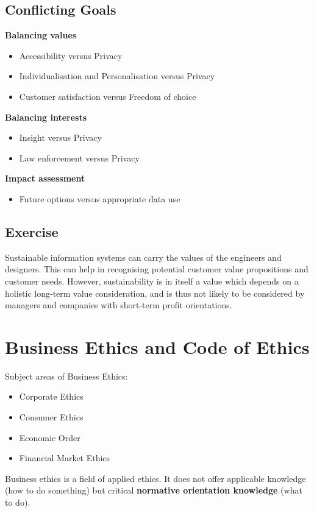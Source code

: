 \documentclass[11pt]{article}
\theoremstyle{definition}
\begin{document}
\subsection{Conflicting Goals}
\textbf{Balancing values}
\begin{itemize}[label=-]
	\item Accessibility versus Privacy
	\item Individualisation and Personalisation versus Privacy
	\item Customer satisfaction versus Freedom of choice
\end{itemize}
\textbf{Balancing interests}
\begin{itemize}[label=-]
	\item Insight versus Privacy
	\item Law enforcement versus Privacy
\end{itemize}
\textbf{Impact assessment}
\begin{itemize}[label=-]
	\item Future options versus appropriate data use
\end{itemize}

\subsection{Exercise}
Sustainable information systems can carry the values of the engineers and designers. This can help in recognising potential customer value propositions and customer needs. However, sustainability is in itself a value which depends on a holistic long-term value consideration, and is thus not likely to be considered by managers and companies with short-term profit orientations.

\clearpage
\section{Business Ethics and Code of Ethics}
Subject areas of Business Ethics:
\begin{itemize}
	\item Corporate Ethics
	\item Consumer Ethics
	\item Economic Order
	\item Financial Market Ethics
\end{itemize}
\begin{definition}
	Business ethics is a field of applied ethics. It does not offer applicable knowledge (how to do something) but critical \textbf{normative orientation knowledge} (what to do).
\end{definition}
\end{document}
